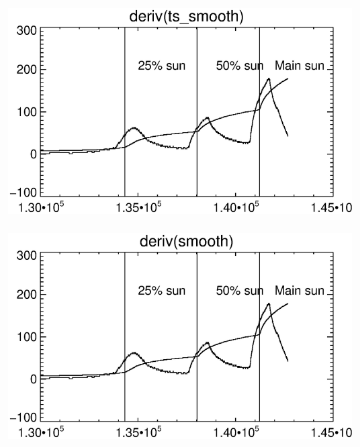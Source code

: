 \documentclass[10pt]{article}
\begin{document}
\begin{figure}[!ht]
    \centering 
    \hspace{-1.0in}
    \begin{subfigure}[b]{.45\linewidth}
        \centering
        \includegraphics[width=1.3\textwidth]{plots_tables_images/d_ts.eps}
    \end{subfigure}
    \hspace{.5in}
    \begin{subfigure}[b]{.45\linewidth}
        \centering
        \includegraphics[width=1.3\textwidth]{plots_tables_images/d_reg.eps}
    \end{subfigure}
   

\end{figure}
\end{document}

